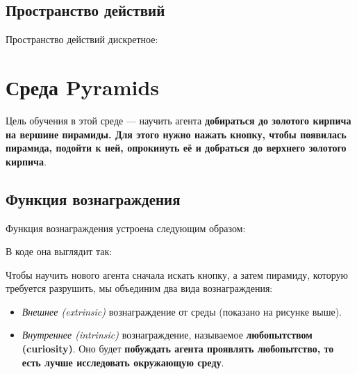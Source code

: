 \documentclass[11pt,a4paper]{article}
\begin{document}
\subsection{Пространство действий}\label{the-action-space}

Пространство действий дискретное:


\section{Среда Pyramids}\label{the-pyramid-environment}

Цель обучения в этой среде --- научить агента \textbf{добираться до золотого кирпича на вершине пирамиды. Для этого нужно нажать кнопку, чтобы появилась пирамида, подойти к ней, опрокинуть её и добраться до верхнего золотого кирпича}.


\subsection{Функция вознаграждения}\label{the-reward-function}

Функция вознаграждения устроена следующим образом:


В коде она выглядит так:


Чтобы научить нового агента сначала искать кнопку, а затем пирамиду, которую требуется разрушить, мы объединим два вида вознаграждения:

\begin{itemize}
\tightlist
\item
  \emph{Внешнее (extrinsic)} вознаграждение от среды (показано на рисунке выше).
\item
  \emph{Внутреннее (intrinsic)} вознаграждение, называемое \textbf{любопытством (curiosity)}. Оно будет \textbf{побуждать агента проявлять любопытство, то есть лучше исследовать окружающую среду}.
\end{itemize}
\end{document}

